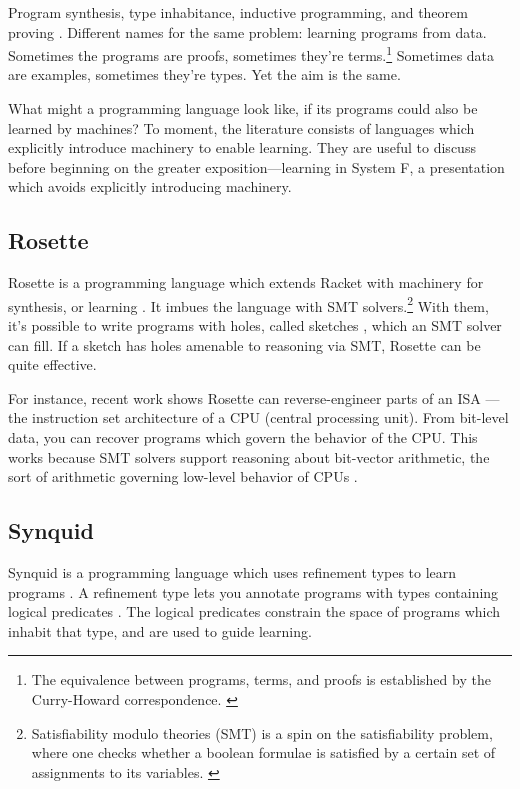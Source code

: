 Program synthesis, type inhabitance, inductive programming, and theorem proving \cite{gulwani2017program}. Different names for the same problem: learning programs from data. Sometimes the programs are proofs, sometimes they're terms.\footnote{The equivalence between programs, terms, and proofs is established by the Curry-Howard correspondence. \cite{wadler2015propositions}} Sometimes data are examples, sometimes they're types. Yet the aim is the same.

What might a programming language look like, if its programs could also be learned by machines? To moment, the literature consists of languages which explicitly introduce machinery to enable learning. They are useful to discuss before beginning on the greater exposition---learning in System F, a presentation which avoids explicitly introducing machinery.

\subsection{Rosette}
Rosette is a programming language which extends Racket with machinery for synthesis, or learning \cite{torlak2013growing}. It imbues the language with SMT solvers.\footnote{Satisfiability modulo theories (SMT) is a spin on the satisfiability problem, where one checks whether a boolean formulae is satisfied by a certain set of assignments to its variables. \cite{barrett2018satisfiability}} With them, it's possible to write programs with holes, called sketches \cite{solar2008program}, which an SMT solver can fill. If a sketch has holes amenable to reasoning via SMT, Rosette can be quite effective.

For instance, recent work shows Rosette can reverse-engineer parts of an ISA \cite{zornsolver}---the instruction set architecture of a CPU (central processing unit). From bit-level data, you can recover programs which govern the behavior of the CPU. This works because SMT solvers support reasoning about bit-vector arithmetic, the sort of arithmetic governing low-level behavior of CPUs \cite{kroening2016decision}.

\subsection{Synquid}
Synquid is a programming language which uses refinement types to learn programs \cite{polikarpova2016program}. A refinement type lets you annotate programs with types containing logical predicates \cite{freeman1994refinement}. The logical predicates constrain the space of programs which inhabit that type, and are used to guide learning. 

